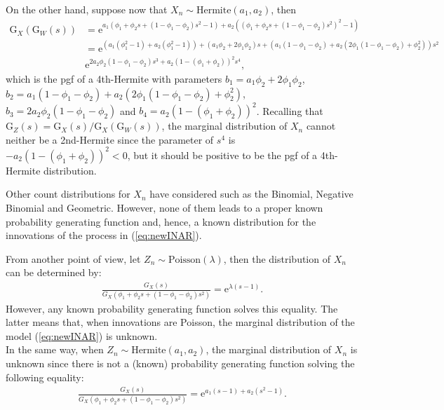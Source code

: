 \documentclass[11pt,a4paper]{article}
\begin{document}
\noindent On the other hand, suppose now that $X_n \sim \textrm{Hermite}(a_1,a_2)$, then 
\begin{align*}
\textrm{G}_X(\textrm{G}_W(s))&=\textrm{e}^{a_1\left(\phi_1+\phi_2s+(1-\phi_1-\phi_2)s^2-1\right)+a_2\left(\left(\phi_1+\phi_2s+(1-\phi_1-\phi_2)s^2\right)^2-1\right)}\\&=\textrm{e}^{\left(a_1(\phi_1^2-1)+a_2(\phi_1^2-1)\right)+\left(a_1\phi_2+2\phi_1\phi_2\right)s+\left(a_1(1-\phi_1-\phi_2)+a_2(2\phi_1(1-\phi_1-\phi_2)+\phi_2^2)\right)s^2}\\ &\textrm{e}^{2a_2\phi_2(1-\phi_1-\phi_2)s^3+a_2(1-(\phi_1+\phi_2))^2s^4},
\end{align*}
which is the pgf of a 4th-Hermite with parameters $b_1=a_1\phi_2+2\phi_1\phi_2$, $b_2=a_1(1-\phi_1-\phi_2)+a_2(2\phi_1(1-\phi_1-\phi_2)+\phi_2^2)$, $b_3=2a_2\phi_2(1-\phi_1-\phi_2)$ and $b_4=a_2(1-(\phi_1+\phi_2))^2$. Recalling that $\textrm{G}_Z(s)=\textrm{G}_X(s)/\textrm{G}_X(\textrm{G}_W(s))$, the marginal distribution of $X_n$ cannot neither be a 2nd-Hermite since the parameter of $s^4$ is $-a_2(1-(\phi_1+\phi_2))^2<0$, but it should be positive to be the pgf of a 4th-Hermite distribution. 

\medskip

\noindent Other count distributions for $X_n$ have considered such as the Binomial, Negative Binomial and Geometric. However, none of them leads to a proper known probability generating function and, hence, a known distribution for the innovations of the process in (\ref{eq:newINAR}). 

\medskip

\noindent From another point of view, let $Z_n \sim \textrm{Poisson}(\lambda)$, then the distribution of $X_n$ can be determined by:
\begin{align}
\frac{G_X(s)}{G_X(\phi_1+\phi_2s+(1-\phi_1-\phi_2)s^2)}=\textrm{e}^{\lambda(s-1)}.
\end{align}
However, any known probability generating function solves this equality. The latter means that, when innovations are Poisson, the marginal distribution of the model (\ref{eq:newINAR}) is unknown. \\ In the same way, when $Z_n \sim \textrm{Hermite}(a_1,a_2)$, the marginal distribution of $X_n$ is unknown since there is not a (known) probability generating function solving the following equality:
\begin{align}
\frac{G_X(s)}{G_X(\phi_1+\phi_2s+(1-\phi_1-\phi_2)s^2)}=\textrm{e}^{a_1(s-1)+a_2(s^2-1)}.
\end{align}
\end{document}
